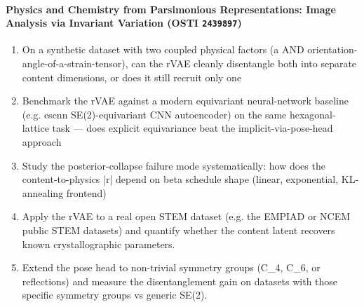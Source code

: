 \paragraph{Physics and Chemistry from Parsimonious Representations: Image Analysis via Invariant Variation \textnormal{\small(OSTI \texttt{2439897})}}
\begin{enumerate}[leftmargin=1.6em,itemsep=0.2em,topsep=0.2em,label=Q\arabic*.]
\item On a synthetic dataset with two coupled physical factors (a AND orientation-angle-of-a-strain-tensor), can the rVAE cleanly disentangle both into separate content dimensions, or does it still recruit only one
\item Benchmark the rVAE against a modern equivariant neural-network baseline (e.g. escnn SE(2)-equivariant CNN autoencoder) on the same hexagonal-lattice task --- does explicit equivariance beat the implicit-via-pose-head approach
\item Study the posterior-collapse failure mode systematically: how does the content-to-physics |r| depend on beta schedule shape (linear, exponential, KL-annealing frontend)
\item Apply the rVAE to a real open STEM dataset (e.g. the EMPIAD or NCEM public STEM datasets) and quantify whether the content latent recovers known crystallographic parameters.
\item Extend the pose head to non-trivial symmetry groups (C\_4, C\_6, or reflections) and measure the disentanglement gain on datasets with those specific symmetry groups vs generic SE(2).
\end{enumerate}
